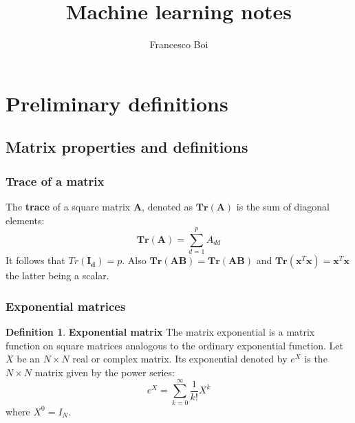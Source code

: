 \documentclass[12pt, letterpaper]{article}
\theoremstyle{definition}
\newtheorem{definition}{Definition}[section]
\newcommand{\Tr}{\mathbf{Tr}}
\newcommand{\x}{\mathbf{x}}
\let\tb\textbf
\begin{document}
\lstset{escapechar=@,style=customc}

\title{Machine learning notes}
\author{Francesco Boi}
\date{\vspace{-5ex}}
\maketitle
{}
\tableofcontents
\section{Preliminary definitions}
\subsection{Matrix properties and definitions}
\subsubsection{Trace of a matrix}
\label{trace}
The \textbf{trace} of a square matrix $\mathbf{A}$, denoted as $\Tr(\mathbf{A})$ is the sum of diagonal elements:
\begin{equation}
\Tr(\mathbf{A}) = \sum_{d=1}^p A_{dd}
\end{equation}
It follows that $Tr(\mathbf{I_d}) = p$.
Also $\Tr(\mathbf{AB}) = \Tr(\mathbf{AB})$ and $\Tr(\x^T\x) = \x^T\x$ the latter being a scalar.

\subsubsection{Exponential matrices}
\label{ExponentialMatrices}
\begin{definition}{\tb{Exponential matrix}} The matrix exponential is a matrix function on square matrices analogous to the ordinary exponential function. Let $X$ be an $N\times N$ real or complex matrix. Its exponential denoted by $e^X$ is the $N \times N$ matrix given by the power series:
\begin{equation}
e^X = \sum_{k=0}^\infty \frac{1}{k!} X^k
\end{equation}
where $X^0 = I_N$.
\end{definition}
\end{document}

